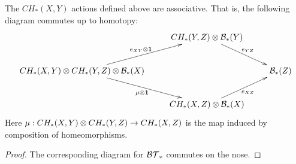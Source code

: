 \begin{thm}
\label{thm:CH-associativity}
The $CH_*(X, Y)$ actions defined above are associative.
That is, the following diagram commutes up to homotopy:
\[ \xymatrix{
& CH_*(Y, Z) \ot \bc_*(Y) \ar[dr]^{e_{YZ}} & \\
CH_*(X, Y) \ot CH_*(Y, Z) \ot \bc_*(X) \ar[ur]^{e_{XY}\ot\id} \ar[dr]_{\mu\ot\id} & & \bc_*(Z) \\
& CH_*(X, Z) \ot \bc_*(X) \ar[ur]_{e_{XZ}} &
} \]
Here $\mu:CH_*(X, Y) \otimes CH_*(Y, Z)\to CH_*(X, Z)$ is the map induced by composition
of homeomorphisms.
\end{thm}
\begin{proof}
The corresponding diagram for ${\mathcal{BT}}_*$ commutes on the nose.
\end{proof}







